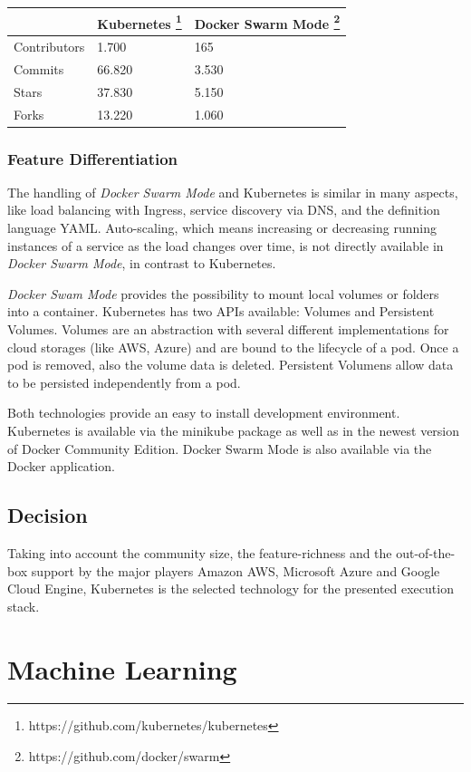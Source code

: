 \begin{longtable}[]{@{}lll@{}}
\toprule
& Kubernetes \footnote{https://github.com/kubernetes/kubernetes} &
Docker Swarm Mode \footnote{https://github.com/docker/swarm}\tabularnewline
\midrule
\endhead
Contributors & 1.700 & 165\tabularnewline
Commits & 66.820 & 3.530\tabularnewline
Stars & 37.830 & 5.150\tabularnewline
Forks & 13.220 & 1.060\tabularnewline
\bottomrule
\end{longtable}

\subsubsection{Feature Differentiation}\label{feature-differentiation}

The handling of \emph{Docker Swarm Mode} and Kubernetes is similar in
many aspects, like load balancing with Ingress, service discovery via
DNS, and the definition language YAML. Auto-scaling, which means
increasing or decreasing running instances of a service as the load
changes over time, is not directly available in \emph{Docker Swarm
Mode}, in contrast to Kubernetes.

\emph{Docker Swam Mode} provides the possibility to mount local volumes
or folders into a container. Kubernetes has two APIs available: Volumes
and Persistent Volumes. Volumes are an abstraction with several
different implementations for cloud storages (like AWS, Azure) and are
bound to the lifecycle of a pod. Once a pod is removed, also the volume
data is deleted. Persistent Volumens allow data to be persisted
independently from a pod.

Both technologies provide an easy to install development environment.
Kubernetes is available via the minikube package as well as in the
newest version of Docker Community Edition. Docker Swarm Mode is also
available via the Docker application.

\subsection{Decision}\label{decision}

Taking into account the community size, the feature-richness and the
out-of-the-box support by the major players Amazon AWS, Microsoft Azure
and Google Cloud Engine, Kubernetes is the selected technology for the
presented execution stack.

\section{Machine Learning}\label{machine-learning}

